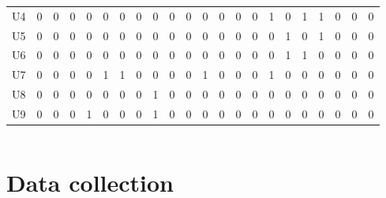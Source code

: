 \documentclass[8pt]{beamer}
\begin{document}
\begin{frame}[fragile]
\begin{columns}[c]
\begin{minipage}[c][.5\textheight][c]{\linewidth}
{\begin{table}
\begin{tabular}{c|ccccccccccccccccccccc}
U4  & 0  & 0  & 0  & 0  & 0  & 0   & 0   & 0   & 0   & 0  & 0  & 0  & 0  & 0  & 1  & 0  & 1  & 1  & 0  & 0  & 0 \\
U5  & 0  & 0  & 0  & 0  & 0  & 0   & 0   & 0   & 0   & 0  & 0  & 0  & 0  & 0  & 0  & 1  & 0  & 1  & 0  & 0  & 0 \\
U6  & 0  & 0  & 0  & 0  & 0  & 0   & 0   & 0   & 0   & 0  & 0  & 0  & 0  & 0  & 0  & 1  & 1  & 0  & 0  & 0  & 0 \\
U7  & 0  & 0  & 0  & 0  & 1  & 1   & 0   & 0   & 0   & 0  & 1  & 0  & 0  & 0  & 1  & 0  & 0  & 0  & 0  & 0  & 0 \\
U8  & 0  & 0  & 0  & 0  & 0  & 0   & 0   & 1   & 0   & 0  & 0  & 0  & 0  & 0  & 0  & 0  & 0  & 0  & 0  & 0  & 0 \\
U9  & 0  & 0  & 0  & 1  & 0  & 0   & 0   & 1   & 0   & 0  & 0  & 0  & 0  & 0  & 0  & 0  & 0  & 0  & 0  & 0  & 0 \\
\bottomrule     
\end{tabular}
\end{table}
}

\end{minipage}

\end{columns}

\end{frame}






\section{Data collection}


\bgroup
{}
\begin{frame}[plain]{}
\begin{center}
\color{white}{\Huge\insertsection}
\end{center}
\end{frame}
\egroup

\end{document}
